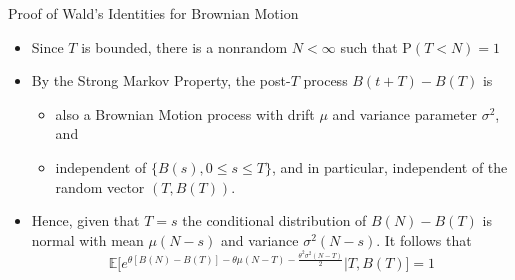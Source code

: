\documentclass[letterpaper,handout]{beamer}
\def\p{\mathrm P}
\def\E{\mathbb E}
\def\V{\mathrm{Var}}
\begin{document}
\begin{frame}{Proof of Wald's Identities for Brownian Motion}
\begin{itemize}
\itemsep=8pt
\item Since $T$ is bounded, there is a nonrandom $N<\infty$ such that $\p(T< N)=1$
\item By the Strong Markov Property, the post-$T$ process $B(t+T)-B(T)$ is
\begin{itemize}\normalsize
\item also a Brownian Motion process with drift $\mu$ and variance parameter $\sigma^2$, and
\item independent of $\{B(s), 0\le s\le T\}$, and in particular, independent of the random vector $(T, B(T))$.
\end{itemize}
\item Hence, given that $T=s$ the conditional distribution of $B(N)-B(T)$
is normal with mean $\mu(N-s)$ and variance $\sigma^2(N-s)$. It follows that
$$\E\Big[e^{\theta [B(N)-B(T)]-\theta\mu(N-T)- \frac{\theta^2\sigma^2(N-T)}{2}}\Big|T, B(T)\Big]=1$$
\end{itemize}
\end{frame}
\end{document}
